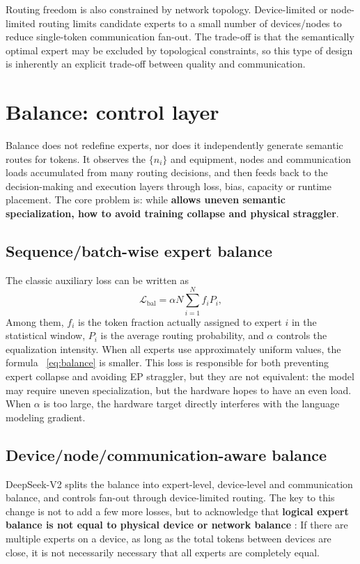 \documentclass[10pt,a4paper,fontset=none]{ctexart}
\newcommand{\term}[1]{\textbf{#1}}
\begin{document}
Routing freedom is also constrained by network topology. Device-limited or node-limited routing limits candidate experts to a small number of devices/nodes to reduce single-token communication fan-out. The trade-off is that the semantically optimal expert may be excluded by topological constraints, so this type of design is inherently an explicit trade-off between quality and communication.

\section{Balance: control layer}

Balance does not redefine experts, nor does it independently generate semantic routes for tokens. It observes the $\{n_i\}$ and equipment, nodes and communication loads accumulated from many routing decisions, and then feeds back to the decision-making and execution layers through loss, bias, capacity or runtime placement. The core problem is: while \term{ allows uneven semantic specialization, how to avoid training collapse and physical straggler}.

\subsection{Sequence/batch-wise expert balance}

The classic auxiliary loss can be written as
\begin{equation}
  \mathcal{L}_{\mathrm{bal}}=\alpha N\sum_{i=1}^{N} f_i P_i,
  \label{eq:balance}
\end{equation}
Among them, $f_i$ is the token fraction actually assigned to expert $i$ in the statistical window, $P_i$ is the average routing probability, and $\alpha$ controls the equalization intensity. When all experts use approximately uniform values, the formula ~\eqref{eq:balance} is smaller. This loss is responsible for both preventing expert collapse and avoiding EP straggler, but they are not equivalent: the model may require uneven specialization, but the hardware hopes to have an even load. When $\alpha$ is too large, the hardware target directly interferes with the language modeling gradient.

\subsection{Device/node/communication-aware balance}

DeepSeek-V2 splits the balance into expert-level, device-level and communication balance, and controls fan-out\cite{deepseekv2} through device-limited routing. The key to this change is not to add a few more losses, but to acknowledge that \term{ logical expert balance is not equal to physical device or network balance }: If there are multiple experts on a device, as long as the total tokens between devices are close, it is not necessarily necessary that all experts are completely equal.
\end{document}
